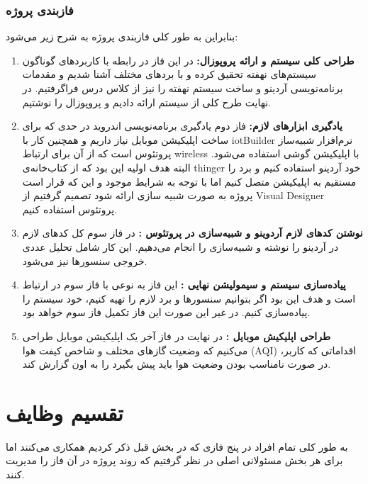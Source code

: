 \subsubsection{فاز‌بندی پروژه}
بنابراین به طور کلی فاز‌بندی پروژه به شرح زیر می‌شود:
\begin{enumerate}
	\item 
	\textbf{ طراحی کلی سیستم و ارائه پروپوزال:}
	در این فاز در رابطه با کاربرد‌های گوناگون سیستم‌های نهفته تحقیق کرده و با برد‌های مختلف آشنا شدیم و مقدمات برنامه‌نویسی آردینو و ساخت سیستم نهفته را نیز از کلاس درس فراگرفتیم. در نهایت طرح کلی از سیستم ارائه دادیم و پروپوزال را نوشتیم.	
	
	\item 
	\textbf{ یادگیری ابزار‌های لازم:}
	فاز دوم یادگیری برنامه‌نویسی اندروید در حدی که برای ساخت اپلیکیشن موبایل نیاز داریم و همچنین کار با iotBuilder نرم‌افزار شبیه‌ساز پروتئوس است که از آن برای ارتباط wireless با اپلیکیشن گوشی استفاده می‌شود. البته هدف اولیه این بود که از کتاب‌خانه‌ی
	thinger
	خود آردینو استفاده کنیم و برد را مستقیم به اپلیکیشن متصل کنیم اما با توجه به شرایط موجود و این که قرار است پروژه به صورت شبیه سازی ارائه شود تصمیم گرفتیم از 
	Visual Designer 
	پروتئوس استفاده کنیم.   
	\item 
	
	\textbf{نوشتن کد‌های لازم آردوینو و شبیه‌سازی در پروتئوس :}
	در فاز سوم کل کد‌های لازم در آردینو را نوشته و شبیه‌سازی‌ را انجام می‌دهیم. این کار شامل تحلیل عددی خروجی سنسور‌ها نیز می‌شود.  
	\item 
	
	\textbf{پیاده‌سازی سیستم و سیمولیشن نهایی :}
	این فاز به نوعی با فاز سوم در ارتباط است و هدف این بود اگر بتوانیم سنسور‌ها و برد لازم را تهیه کنیم، خود سیستم را پیاده‌سازی کنیم. در غیر این صورت این فاز تکمیل فاز سوم خواهد بود. 
	\item 
	\textbf{ طراحی اپلیکیش موبایل :}
	در نهایت در فاز آخر یک اپلیکیشن موبایل طراحی می‌کنیم که وضعیت گاز‌های مختلف و شاخص کیفت هوا (AQI) ،اقداماتی که کاربر در صورت نامناسب بودن وضعیت هوا باید پیش بگیرد را به اون گزارش کند. 	
\end{enumerate}
\pagebreak
\section{تقسیم وظایف}
به طور کلی تمام افراد در پنج فازی که در بخش قبل ذکر کردیم همکاری می‌کنند اما برای هر بخش مسئولانی اصلی در نظر گرفتیم که روند پروژه در آن فاز را مدیریت کنند. 

